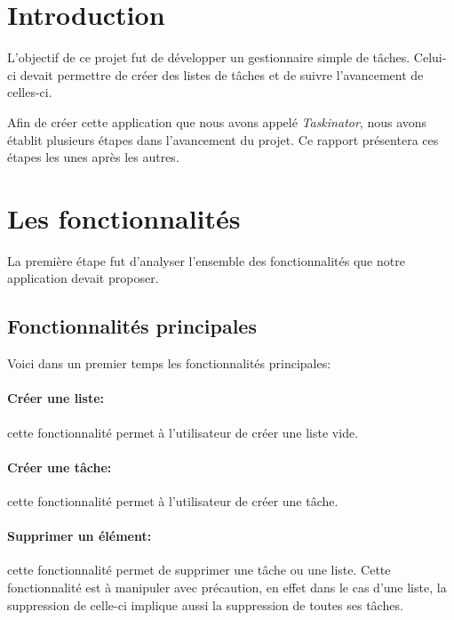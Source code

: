 \documentclass[a4paper,10pt]{article}
\begin{document}
\newpage
\pagestyle{fancy}

\section{Introduction}
L'objectif de ce projet fut de développer un gestionnaire simple de tâches. Celui-ci devait permettre de créer des listes de tâches et de suivre l'avancement de celles-ci.

Afin de créer cette application que nous avons appelé \textit{Taskinator}, nous avons établit plusieurs étapes dans l'avancement du projet. Ce rapport présentera ces étapes les unes après les autres.

\newpage
\section{Les fonctionnalités}
La première étape fut d'analyser l'ensemble des fonctionnalités que notre application devait proposer. 

\subsection{Fonctionnalités principales}
Voici dans un premier temps les fonctionnalités principales:
\paragraph{Créer une liste:} cette fonctionnalité permet à l'utilisateur de créer une liste vide.
\paragraph{Créer une tâche:} cette fonctionnalité permet à l'utilisateur de créer une tâche.
\paragraph{Supprimer un élément:} cette fonctionnalité permet de supprimer une tâche ou une liste. Cette fonctionnalité est à manipuler avec précaution, en effet dans le cas d'une liste, la suppression de celle-ci implique aussi la suppression de toutes ses tâches.
\end{document}
